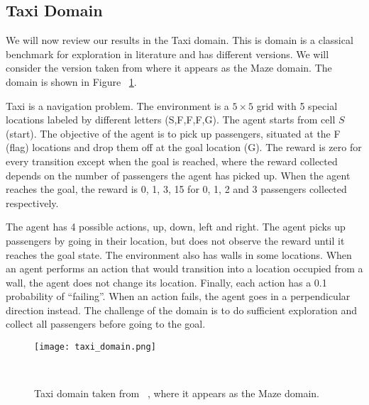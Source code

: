 \subsection{Taxi Domain}
We will now review our results in the Taxi domain. This is domain is a classical benchmark for exploration in literature and has different versions. We will consider the version taken from \cite{Dearden98bayesianq-learning} where it appears as the Maze domain. The domain is shown in Figure ~\ref{fig:taxi_domain}.\par 
Taxi is a navigation problem. The environment is a $5\times5$ grid with 5 special locations labeled by different letters (S,F,F,F,G). The agent starts from cell $S$ (start). The objective of the agent is to pick up passengers, situated at the F (flag) locations and drop them off at the goal location (G). The reward is zero for every transition except when the goal is reached, where the reward collected depends on the number of passengers the agent has picked up. When the agent reaches the goal, the reward is 0, 1, 3, 15 for 0, 1, 2 and 3 passengers collected respectively.\par 
The agent has 4 possible actions, up, down, left and right. The agent picks up passengers by going in their location, but does not observe the reward until it reaches the goal state. The environment also has walls in some locations. When an agent performs an action that would transition into a location occupied from a wall, the agent does not change its location. Finally, each action has a 0.1 probability of ``failing''. When an action fails, the agent goes in a perpendicular direction instead. The challenge of the domain is to do sufficient exploration and collect all passengers before going to the goal.
\begin{figure}
 \texttt{[image: taxi\_domain.png]}
 \caption{Taxi domain taken from ~\cite{Dearden98bayesianq-learning}, where it appears as the Maze domain.} ~
 \label{fig:taxi_domain}
\end{figure}
